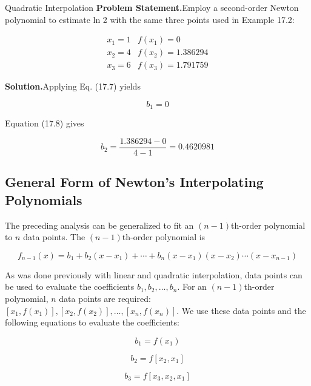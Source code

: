 \documentclass[../main.tex]{subfiles}
\begin{document}

\begin{example} Quadratic Interpolation
	\noindent\textbf{Problem Statement.}\quad Employ a second-order Newton polynomial to estimate ln 2 with
	the same three points used in Example 17.2:

	$$
	\begin{matrix}
		x_1 = 1 & f (x_1) = 0 \\
		x_2 = 4 & f (x_2 ) = 1.386294 \\
		x_3 = 6 & f (x_3 ) = 1.791759
	\end{matrix}
	$$

    \noindent\textbf{Solution.}\quad Applying Eq. (17.7) yields

	$$
	b_1 = 0
	$$

	\noindent Equation (17.8) gives

	$$
		b_2 = \frac{1.386294 - 0
		}{4-1} = 0.4620981
	$$
\end{example}

\label{cha:cha_P_17_2_3} %
\subsection{General Form of Newton's Interpolating Polynomials}

\noindent The preceding analysis can be generalized to fit an $(n - 1)$th-order polynomial to $n$ data
points. The $(n - 1)$th-order polynomial is

\begin{equation}
	\tag{17.10}
	f_{n-1}(x) = b_1 + b_2 (x - x_1) + \cdots + b_n (x - x_1) (x - x_2) \cdots (x - x_{n-1})
\end{equation}

\noindent As was done previously with linear and quadratic interpolation, data points can be used to
evaluate the coefficients $b_1 , b_2 , \dots , b_n$. For an $(n - 1)$th-order polynomial, $n$ data points
are required: $[x_1 , f (x_1)], [x_2 , f (x_2)], \dots , [x_n , f (x_n )]$. We use these data points and the
following equations to evaluate the coefficients:

\begin{equation}
	\tag{17.11}
	b_1 = f(x_1)
\end{equation}

\begin{equation}
	\tag{17.12}
	b_2 = f[x_2,x_1]
\end{equation}

\begin{equation}
	\tag{17.13}
	b_3 = f[x_3, x_2, x_1]
\end{equation}
\end{document}
